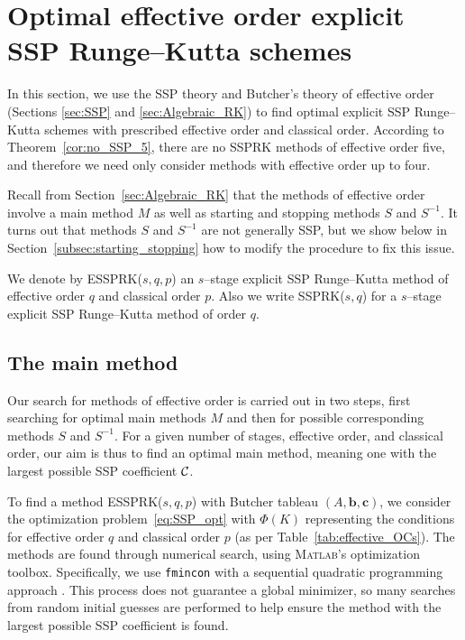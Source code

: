 \section{Optimal effective order explicit SSP Runge--Kutta schemes}\label{sec:optimal_ESSPRK}
In this section, we use the SSP theory and Butcher's theory of effective
order (Sections \ref{sec:SSP} and \ref{sec:Algebraic_RK}) to find
optimal explicit SSP Runge--Kutta schemes with prescribed effective
order and classical order.
According to Theorem~\ref{cor:no_SSP_5}, there are no SSPRK methods of
effective order five, and therefore we need only consider methods with
effective order up to four.

Recall from Section~\ref{sec:Algebraic_RK} that the methods of
effective order involve a main method $M$ as well as starting and
stopping methods $S$ and $S^{-1}$.
It turns out that methods $S$ and $S^{-1}$ are not generally SSP, but
we show below in Section~\ref{subsec:starting_stopping} how to modify
the procedure to fix this issue.

We denote by ESSPRK($s,q,p$) an $s$--stage explicit SSP Runge--Kutta 
method of effective order $q$ and classical order $p$.
Also we write SSPRK($s,q$) for a  $s$--stage explicit SSP Runge--Kutta 
method of order $q$.

\subsection{The main method}\label{subsec:main_method}

Our search for methods of effective order is carried out in two
steps, first searching for optimal main methods $M$ and then for
possible corresponding methods $S$ and $S^{-1}$.
For a given number of stages, effective order, and classical order,
our aim is thus to find an optimal main method, meaning one with the 
largest possible SSP coefficient $\mathcal{C}$.

To find a method ESSPRK($s,q,p$) with Butcher tableau $(A, \bm{b},
\bm{c})$, we consider the optimization problem~\eqref{eq:SSP_opt} 
with $\Phi(K)$ representing the conditions for effective order
$q$ and classical order $p$ (as per Table~\ref{tab:effective_OCs}).
The methods are found through numerical search, using 
\textsc{Matlab}'s optimization toolbox.
Specifically, we use \texttt{fmincon} with a sequential quadratic 
programming approach \cite{Ketcheson2008, Ketcheson/Macdonald/Gottlieb:2009}.
This process does not guarantee a global minimizer, so many searches 
from random initial guesses are performed to help ensure the method with
the largest possible SSP coefficient is found.

